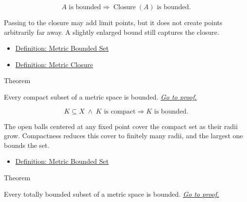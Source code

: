 \begin{remark*}
\[
A\text{ is bounded}
\Longrightarrow
\operatorname{Closure}(A)\text{ is bounded}.
\]
\end{remark*}

\begin{remark*}[Interpretation]
Passing to the closure may add limit points, but it does not create points
arbitrarily far away.  A slightly enlarged bound still captures the closure.
\end{remark*}

\begin{dependencies}
\begin{itemize}
  \item \hyperref[def:metric-bounded-set]{Definition: Metric Bounded Set}
  \item \hyperref[def:metric-closure]{Definition: Metric Closure}
\end{itemize}
\end{dependencies}

\begin{theorembox}{Theorem}
\begin{theorem}\label{thm:metric-compact-sets-bounded}
Every compact subset of a metric space is bounded.
\hyperref[prf:metric-compact-sets-bounded]{\textit{Go to proof.}}
\end{theorem}
\end{theorembox}

\begin{remark*}
\[
K\subseteq X
\;\land\;
K\text{ is compact}
\Longrightarrow
K\text{ is bounded}.
\]
\end{remark*}

\begin{remark*}[Interpretation]
The open balls centered at any fixed point cover the compact set as their
radii grow.  Compactness reduces this cover to finitely many radii, and the
largest one bounds the set.
\end{remark*}

\begin{dependencies}
\begin{itemize}
  \item \hyperref[def:metric-bounded-set]{Definition: Metric Bounded Set}
\end{itemize}
\end{dependencies}

\begin{theorembox}{Theorem}
\begin{theorem}
\label{thm:metric-totally-bounded-sets-bounded}
Every totally bounded subset of a metric space is bounded.
\hyperref[prf:metric-totally-bounded-sets-bounded]{\textit{Go to proof.}}
\end{theorem}
\end{theorembox}

